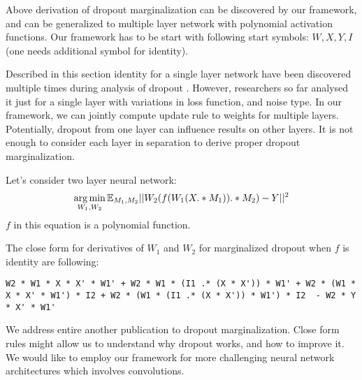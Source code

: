 Above derivation of dropout marginalization can be discovered by our framework, and can be generalized
to multiple layer network with polynomial activation functions. Our framework
has to be start with following start symbols: $W, X, Y, I$ (one needs additional symbol for identity).


Described in this section identity for a single layer network have been discovered multiple times during
analysis of dropout \cite{chen2013learning, chen2012marginalized, maaten2013learning}. 
However, researchers so far analysed it just for a single layer with variations in loss function, and noise type.
In our framework, we can jointly compute update rule to weights for multiple layers. 
Potentially, dropout from one layer can influence results on other layers. It is not enough
to consider each layer in separation to derive proper dropout marginalization.


Let's consider two layer neural network:
\begin{equation*}
  \operatorname*{arg\,min}_{W_1, W_2} \mathbb{E}_{M_1, M_2} ||W_2(f(W_1(X .* M_1)) .* M_2) - Y||^2
\end{equation*}
$f$ in this equation is a polynomial function. 

The close form for derivatives of $W_1$ and $W_2$ for marginalized 
dropout when $f$ is identity are following:
\begin{lstlisting}
W2 * W1 * X * X' * W1' + W2 * W1 * (I1 .* (X * X')) * W1' + W2 * (W1 * X * X' * W1') * I2 + W2 * (W1 * (I1 .* (X * X')) * W1') * I2  - W2 * Y * X' * W1'
\end{lstlisting}



We address entire another publication to dropout marginalization. Close form rules might
allow us to understand why dropout works, and how to improve it. We would like to 
employ our framework for more challenging neural network architectures which involves
convolutions.
